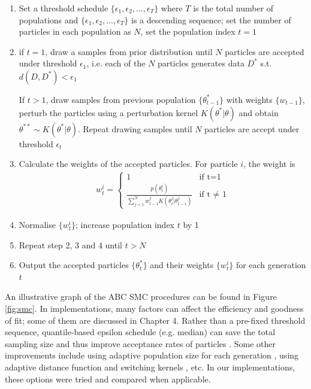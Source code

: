 \begin{enumerate}
    \item Set a threshold schedule $\{\epsilon_1, \epsilon_2, ..., \epsilon_T\}$ where $T$ is the total number of populations and $\{\epsilon_1, \epsilon_2, ..., \epsilon_T\}$ is a descending sequence; set the number of particles in each population as $N$, set the population index $t=1$
    \item if $t=1$, draw a samples from prior distribution until $N$ particles are accepted under threshold $\epsilon_1$, i.e. each of the $N$ particles generates data $D^*$ s.t. $d(D,D^*)<\epsilon_1$
    
    If $t>1$, draw samples from previous population $\{\theta^*_{t-1}\}$ with weights $\{w_{t-1}\}$, perturb the particles using a perturbation kernel $K(\theta^*|\theta)$ and obtain $\theta^{**}\sim K(\theta^*|\theta)$. Repeat drawing samples until $N$ particles are accept under threshold $\epsilon_t$
    \item Calculate the weights of the accepted particles. For particle $i$, the weight is 
    \begin{align}
        \label{eq:weight}
        w^i_t =\begin{cases}
            1 & \text{if t=1} \\
            \frac{p(\theta^i_t)}{\sum_{j=1}^{N} w^j_{t-1}K(\theta^j_t|\theta^j_{t-1})} & \text{if t $\neq$ 1} 
        \end{cases}
    \end{align}
    
    \item Normalise $\{w^i_t\}$; increase population index $t$ by 1
    \item Repeat step 2, 3 and 4 until $t>N$
    \item Output the accepted particles $\{\theta^*_{t}\}$ and their weights $\{w^i_t\}$ for each generation $t$

\end{enumerate}

An illustrative graph of the ABC SMC procedures can be found in Figure \ref{fig:smc}. In implementations, many factors can affect the efficiency and goodness of fit; some of them are discussed in Chapter 4. Rather than a pre-fixed threshold sequence, quantile-based epsilon schedule (e.g. median) can save the total sampling size and thus improve acceptance rates of particles \cite{threshold}. Some other improvements include using adaptive population size for each generation \cite{population}, using adaptive distance function \cite{ref:adpt_dis} and switching kernels \cite{ref:kernel}, etc. In our implementations, these options were tried and compared when applicable.

